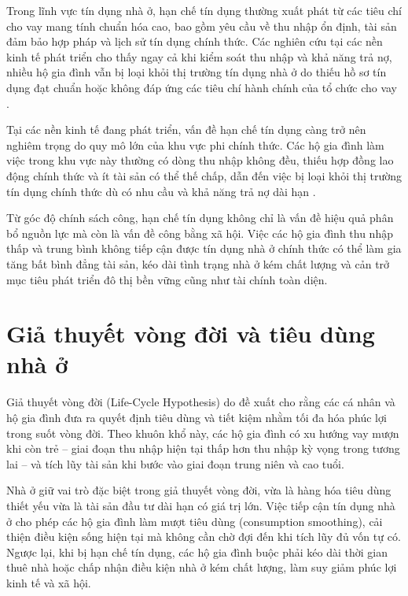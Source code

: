 \documentclass[12pt,a4paper]{report}
\begin{document}
	Trong lĩnh vực tín dụng nhà ở, hạn chế tín dụng thường xuất phát từ các tiêu chí cho vay mang tính chuẩn hóa cao, bao gồm yêu cầu về thu nhập ổn định, tài sản đảm bảo hợp pháp và lịch sử tín dụng chính thức. Các nghiên cứu tại các nền kinh tế phát triển cho thấy ngay cả khi kiểm soát thu nhập và khả năng trả nợ, nhiều hộ gia đình vẫn bị loại khỏi thị trường tín dụng nhà ở do thiếu hồ sơ tín dụng đạt chuẩn hoặc không đáp ứng các tiêu chí hành chính của tổ chức cho vay \parencite{urban2024Barriers,lewisfaupel2024disparities}.
	
	Tại các nền kinh tế đang phát triển, vấn đề hạn chế tín dụng càng trở nên nghiêm trọng do quy mô lớn của khu vực phi chính thức. Các hộ gia đình làm việc trong khu vực này thường có dòng thu nhập không đều, thiếu hợp đồng lao động chính thức và ít tài sản có thể thế chấp, dẫn đến việc bị loại khỏi thị trường tín dụng chính thức dù có nhu cầu và khả năng trả nợ dài hạn \parencite{arrieta2005Mortgage}.
	
	Từ góc độ chính sách công, hạn chế tín dụng không chỉ là vấn đề hiệu quả phân bổ nguồn lực mà còn là vấn đề công bằng xã hội. Việc các hộ gia đình thu nhập thấp và trung bình không tiếp cận được tín dụng nhà ở chính thức có thể làm gia tăng bất bình đẳng tài sản, kéo dài tình trạng nhà ở kém chất lượng và cản trở mục tiêu phát triển đô thị bền vững cũng như tài chính toàn diện.
	
	\section{Giả thuyết vòng đời và tiêu dùng nhà ở}
	
	Giả thuyết vòng đời (Life-Cycle Hypothesis) do \textcite{Modigliani1963} đề xuất cho rằng các cá nhân và hộ gia đình đưa ra quyết định tiêu dùng và tiết kiệm nhằm tối đa hóa phúc lợi trong suốt vòng đời. Theo khuôn khổ này, các hộ gia đình có xu hướng vay mượn khi còn trẻ – giai đoạn thu nhập hiện tại thấp hơn thu nhập kỳ vọng trong tương lai – và tích lũy tài sản khi bước vào giai đoạn trung niên và cao tuổi.
	
	Nhà ở giữ vai trò đặc biệt trong giả thuyết vòng đời, vừa là hàng hóa tiêu dùng thiết yếu vừa là tài sản đầu tư dài hạn có giá trị lớn. Việc tiếp cận tín dụng nhà ở cho phép các hộ gia đình làm mượt tiêu dùng (consumption smoothing), cải thiện điều kiện sống hiện tại mà không cần chờ đợi đến khi tích lũy đủ vốn tự có. Ngược lại, khi bị hạn chế tín dụng, các hộ gia đình buộc phải kéo dài thời gian thuê nhà hoặc chấp nhận điều kiện nhà ở kém chất lượng, làm suy giảm phúc lợi kinh tế và xã hội.
	
\end{document}

